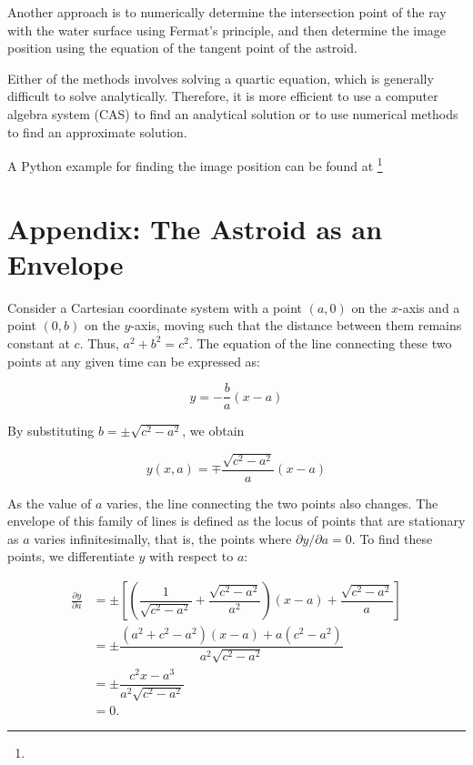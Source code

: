 \documentclass[twocolumn]{article}
\begin{document}
Another approach is to numerically determine the intersection point of the ray with the water surface using Fermat's principle, and then determine the image position using the equation of the tangent point of the astroid.

Either of the methods involves solving a quartic equation, which is generally difficult to solve analytically. Therefore, it is more efficient to use a computer algebra system (CAS) to find an analytical solution or to use numerical methods to find an approximate solution.

A Python example for finding the image position can be found at 
\href{https://github.com/mingshey/python_projects/blob/main/Refraction_Image.ipynb}%
{}\footnote{}

\appendix
\newcommand{\pd}[2]{{\frac{\partial #1}{\partial #2}}}
\newcommand{\ilpd}[2]{{{\partial #1}/{\partial #2}}}
\section*{Appendix: The Astroid as an Envelope}

Consider a Cartesian coordinate system with a point $(a, 0)$ on the $x$-axis and a point $(0, b)$ on the $y$-axis, moving such that the distance between them remains constant at $c$. Thus, $a^2+b^2=c^2$. The equation of the line connecting these two points at any given time can be expressed as:

$$y=-\dfrac{b}{a}(x-a)$$

By substituting $b=\pm \sqrt{c^2-a^2}$, we obtain

$$y(x, a) = \mp \dfrac{\sqrt{c^2-a^2}}{a}(x-a)$$

As the value of $a$ varies, the line connecting the two points also changes. The envelope of this family of lines is defined as the locus of points that are stationary as $a$ varies infinitesimally, that is, the points where $\ilpd{y}{a} = 0$. To find these points, we differentiate $y$ with respect to $a$:

$$ \begin{aligned}
	\pd{y}{a} &= \pm\left[\left( \dfrac{1}{\sqrt{c^2-a^2}}+\dfrac{\sqrt{c^2-a^2}}{a^2}\right) (x-a) + \dfrac{\sqrt{c^2-a^2}}{a} \right]\\
	&= \pm \dfrac{(a^2+c^2-a^2)(x-a)+a(c^2-a^2)}{a^2\sqrt{c^2-a^2}}\\
	&= \pm \dfrac{c^2 x - a^3}{a^2 \sqrt{c^2 - a^2}}\\
	&= 0.
\end{aligned}
$$
\end{document}

